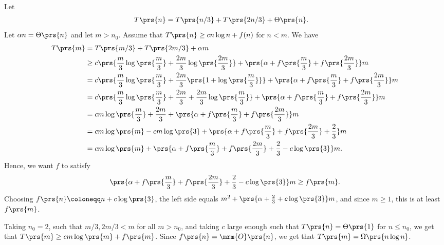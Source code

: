 \documentclass[oneside]{scrbook}
\theoremstyle{definition}
\begin{document}
\begin{exercise}
    Let
    \begin{align*}
        T\prs{n} &= T\prs{n/3} + T\prs{2n/3} + \Theta\prs{n} \text{.}
    \end{align*}
    Let $\alpha n = \Theta\prs{n}$ and let $m > n_0$. Assume that $T\prs{n} \geq c n \log n + f(n)$ for $n < m$.
    We have
    \begin{align*}
        T\prs{m} &= T\prs{m/3} + T\prs{2m/3} + \alpha m
        \\&\geq
        c \prs{\frac{m}{3} \log\prs{\frac{m}{3}} + \frac{2m}{3} \log\prs{\frac{2m}{3}}} + \prs{\alpha + f\prs{\frac{m}{3}} + f\prs{\frac{2m}{3}}} m
        \\&=
        c \prs{\frac{m}{3} \log\prs{\frac{m}{3}} + \frac{2m}{3} \prs{1 + \log\prs{\frac{m}{3}}}} + \prs{\alpha + f\prs{\frac{m}{3}} + f\prs{\frac{2m}{3}}} m
        \\&= c \prs{\frac{m}{3} \log\prs{\frac{m}{3}} + \frac{2m}{3} + \frac{2m}{3} \log\prs{\frac{m}{3}}} + \prs{\alpha + f\prs{\frac{m}{3}} + f\prs{\frac{2m}{3}}} m
        \\&= cm \log\prs{\frac{m}{3}} + \frac{2m}{3} + \prs{\alpha + f\prs{\frac{m}{3}} + f\prs{\frac{2m}{3}}} m
        \\&= cm \log\prs{m} - cm \log\prs{3} + \prs{\alpha + f\prs{\frac{m}{3}} + f\prs{\frac{2m}{3}} + \frac{2}{3}} m
        \\&= cm \log\prs{m} + \prs{\alpha + f\prs{\frac{m}{3}} + f\prs{\frac{2m}{3}} + \frac{2}{3} - c \log\prs{3}} m \text{.}
    \end{align*}
	Hence, we want $f$ to satisfy
	\[\prs{\alpha + f\prs{\frac{m}{3}} + f\prs{\frac{2m}{3}} + \frac{2}{3} - c\log\prs{3}} m \geq f\prs{m} \text{.}\]
	Choosing $f\prs{n} \coloneqq n + c \log\prs{3}$, the left side equals $m^2 + \prs{\alpha + \frac{2}{3} + c \log\prs{3}}m$, and since $m \geq 1$, this is at least $f\prs{m}$.
	
	Taking $n_0 = 2$, such that $m/3, 2m/3 < m$ for all $m > n_0$, and taking $c$ large enough such that $T\prs{n} = \Theta\prs{1}$ for $n \leq n_0$, we get that $T\prs{m} \geq cm \log\prs{m} + f\prs{m}$. Since $f\prs{n} = \mrm{O}\prs{n}$, we get that $T\prs{m} = \Omega\prs{n \log n}$.
\end{exercise}
\end{document}
